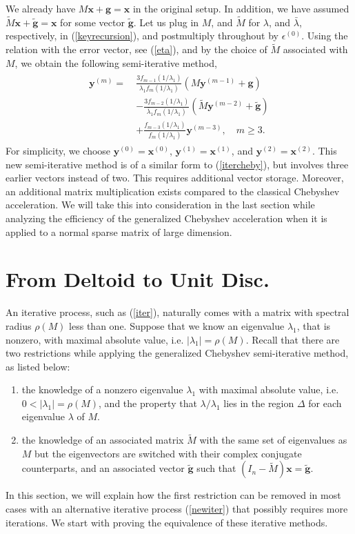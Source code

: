 \documentclass[reqno]{amsart}
\newcommand{\mb}{\mathbf}
\numberwithin{equation}{section}
\theoremstyle{plain}
\theoremstyle{definition}
\begin{document}
We already have $M\mb{x}+\mb{g}=\mb{x}$ in the original setup. In addition, we have assumed  $\widetilde{M}\mb{x} + \widetilde{\mb{g}}=\mb{x}$ for some vector $\widetilde{\mb{g}}$. Let us plug in $M$, and $\widetilde{M}$ for $\lambda$, and $\bar{\lambda}$, respectively, in (\ref{keyrecursion}), and postmultiply throughout by $\epsilon^{(0)}$. Using the relation with the error vector, see (\ref{eta}), and by the choice of $\widetilde{M}$ associated with $M$, we obtain the following semi-iterative method,
\begin{align}\label{main}
	\begin{split}		
		\mb{y}^{(m)}=\ &\frac{3f_{m-1}(1/\lambda_1)}{\lambda_1 f_m(1/\lambda_1)}\left( M\mb{y}^{(m-1)} + \mb{g} \right) \\
		& -\frac{3f_{m-2}(1/\lambda_1)}{\bar{\lambda}_1 f_m(1/\lambda_1)}\left( \widetilde{M}\mb{y}^{(m-2)} + \widetilde{\mb{g}} \right)\\
		& +\frac{f_{m-3}(1/\lambda_1)}{f_m(1/\lambda_1)}\mb{y}^{(m-3)}, \quad m\geq 3.
	\end{split}		
\end{align}
For simplicity, we choose $\mb{y}^{(0)}=\mb{x}^{(0)}$, $\mb{y}^{(1)}=\mb{x}^{(1)}$, and $\mb{y}^{(2)}=\mb{x}^{(2)}$. This new semi-iterative method is of a similar form to (\ref{itercheby}), but involves three earlier vectors instead of two. This requires additional vector storage. Moreover, an additional matrix multiplication exists compared to the classical Chebyshev acceleration. We will take this into consideration in the last section while analyzing the efficiency of the generalized Chebyshev acceleration when it is applied to a normal sparse matrix of large dimension.



\section{From Deltoid to Unit Disc.}
An iterative process, such as (\ref{iter}), naturally comes with a matrix with spectral radius $\rho(M)$ less than one. Suppose that we know an eigenvalue $\lambda_1$, that is nonzero, with maximal absolute value, i.e. $|\lambda_1|=\rho(M)$. Recall that there are two restrictions while applying the generalized Chebyshev semi-iterative method, as listed below:
\begin{enumerate}
	\item the knowledge of a nonzero eigenvalue $\lambda_1$ with maximal absolute value, i.e. $0<|\lambda_1|=\rho(M)$, and the property that $\lambda/\lambda_1$ lies in the region $\Delta$ for each eigenvalue $\lambda$ of $M$.	
	\item the knowledge of an associated matrix $\widetilde{M}$ with the same set of eigenvalues as $M$ but the eigenvectors are switched with their complex conjugate counterparts, and an associated vector $\widetilde{\mb{g}}$ such that $(I_n-\widetilde{M})\mathbf{x}=\widetilde{\mb{g}}$.
\end{enumerate}
In this section, we will explain how the first restriction can be removed in most cases with an alternative iterative process (\ref{newiter}) that possibly requires more iterations. We start with proving the equivalence of these iterative methods.
\end{document}
